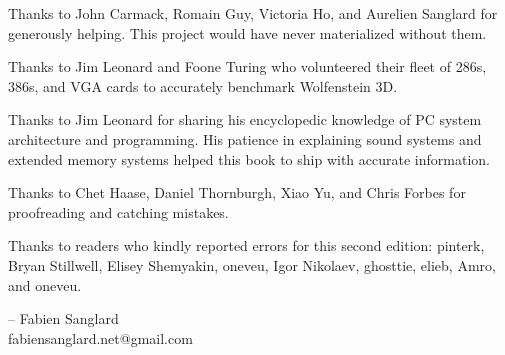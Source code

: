 Thanks to John Carmack, Romain Guy, Victoria Ho, and Aurelien Sanglard for generously helping. This project would have never
materialized without them.\\ 
\par
Thanks to  Jim Leonard and Foone Turing who volunteered their fleet of 286s, 386s, and VGA cards to accurately benchmark Wolfenstein 3D.\\
\par
Thanks to  Jim Leonard for sharing his encyclopedic knowledge of PC system architecture and programming. His patience in explaining sound systems and extended memory systems helped this book to ship with accurate information.\\
\par
Thanks to  Chet Haase, Daniel Thornburgh, Xiao Yu, and Chris Forbes for proofreading and catching mistakes.\\
\par
Thanks to readers who kindly reported errors for this second edition: pinterk, Bryan Stillwell, Elisey Shemyakin, oneveu, Igor Nikolaev, ghosttie, elieb, Amro, and oneveu.\\
\par
-- Fabien Sanglard\\
fabiensanglard.net@gmail.com
